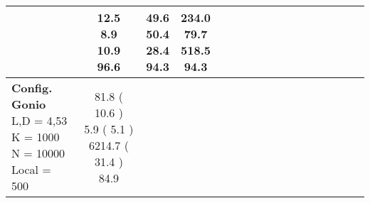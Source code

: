 \documentclass[9pt]{article}
\begin{document}
\begin{landscape}
\begin{longtable}{ l | c c c c | c c c c | c c c c | c c c c |}
             &
                            \makecell{              12.5
     \\
            {\footnotesize             8.9
    } \\  {\footnotesize             10.9
     } \\
            {\small \textcolor[rgb]{ 0.268 , 0.632 , 0.1} {96.6  }
} }
             &                         \makecell{              \textbf{ 49.6 }
     \\
            {\footnotesize             \textbf{ 50.4 }
    } \\  {\footnotesize             28.4
     } \\
            {\small \textcolor[rgb]{ 0.314 , 0.586 , 0.1} {94.3  }
} }
             &
                            \makecell{              234.0
     \\
            {\footnotesize             79.7
    } \\  {\footnotesize             518.5
     } \\
            {\small \textcolor[rgb]{ 0.314 , 0.586 , 0.1} {94.3  }
} }
            

 \\
                                                            
                    \hline
                    \makecell{ \textbf{ Config. Gonio} \\
                    { \small L,D = 4,53} \\
                    {\small K = 1000} \\
                    {\small N = 10000 } \\ {\small Local = 500 }} &
                    
                            \makecell{              81.8
     (             10.6
    ) \\
            {\footnotesize             5.9
     (              5.1
     )} \\
            {\footnotesize             6214.7
     (            31.4
    ) } \\
            {\small  \textcolor[rgb]{ 0.502 , 0.398 , 0.1} {84.9  }
} }



\end{longtable}
\end{landscape}
\end{document}
